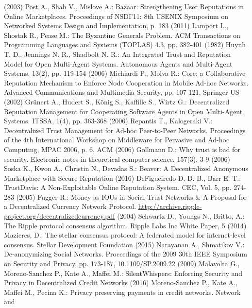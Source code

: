 \begin{thebibliography}{40}
  (2003)
  Post A., Shah V., Mislove A.: Bazaar: Strengthening User Reputations in Online Marketplaces. Proceedings of NSDI'11:
  8th USENIX Symposium on Networked Systems Design and Implementation, p. 183 (2011)
  Lamport L., Shostak R., Pease M.: The Byzantine Generals Problem. ACM Transactions on Programming Languages and Systems
  (TOPLAS) 4.3, pp. 382-401 (1982)
  Huynh T. D., Jennings N. R., Shadbolt N. R.: An Integrated Trust and Reputation Model for Open Multi-Agent Systems.
  Autonomous Agents and Multi-Agent Systems, 13(2), pp. 119-154 (2006)
  Michiardi P., Molva R.: Core: a Collaborative Reputation Mechanism to Enforce Node Cooperation in Mobile Ad-hoc
  Networks. Advanced Communications and Multimedia Security, pp. 107-121, Springer US (2002)
  Gr\"unert A., Hudert S., K\"onig S., Kaffille S., Wirtz G.: Decentralized Reputation Management for Cooperating Software
  Agents in Open Multi-Agent Systems. ITSSA, 1(4), pp. 363-368 (2006)
  Repantis T., Kalogeraki V.: Decentralized Trust Management for Ad-hoc Peer-to-Peer Networks. Proceedings of the 4th
  International Workshop on Middleware for Pervasive and Ad-hoc Computing, MPAC 2006, p. 6, ACM (2006)
  Gollmann D.: Why trust is bad for security. Electronic notes in theoretical computer science, 157(3), 3-9 (2006)
  Soska K., Kwon A., Christin N., Devadas S.: Beaver: A Decentralized Anonymous Marketplace with Secure Reputation (2016)
  DeFigueiredo D. D. B., Barr E. T.: TrustDavis: A Non-Exploitable Online Reputation System. CEC, Vol. 5, pp. 274-283
  (2005)
  Fugger R.: Money as IOUs in Social Trust Networks \& A Proposal for a Decentralized Currency Network Protocol.
  \url{http://archive.ripple-project.org/decentralizedcurrency.pdf} (2004)
  Schwartz D., Youngs N., Britto, A.: The Ripple protocol consensus algorithm. Ripple Labs Inc White Paper, 5 (2014)
  Mazieres, D.: The stellar consensus protocol: A federated model for internet-level consensus. Stellar Development
  Foundation (2015)
  Narayanan A., Shmatikov V.: De-anonymizing Social Networks. Proceedings of the 2009 30th IEEE Symposium on Security and
  Privacy, pp. 173-187, 10.1109/SP.2009.22 (2009)
  Malavolta G., Moreno-Sanchez P., Kate A.,  Maffei M.: SilentWhispers: Enforcing Security and Privacy in Decentralized
  Credit Networks (2016)
  Moreno-Sanchez P., Kate A., Maffei M., Pecina K.: Privacy preserving payments in credit networks. Network and

\end{thebibliography}
